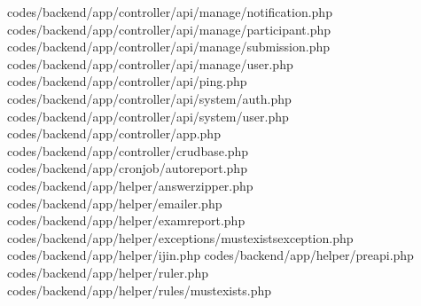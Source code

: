 codes/backend/app/controller/api/manage/notification.php
codes/backend/app/controller/api/manage/participant.php
codes/backend/app/controller/api/manage/submission.php
codes/backend/app/controller/api/manage/user.php
codes/backend/app/controller/api/ping.php
codes/backend/app/controller/api/system/auth.php
codes/backend/app/controller/api/system/user.php
codes/backend/app/controller/app.php
codes/backend/app/controller/crudbase.php
codes/backend/app/cronjob/autoreport.php
codes/backend/app/helper/answerzipper.php
codes/backend/app/helper/emailer.php
codes/backend/app/helper/examreport.php
codes/backend/app/helper/exceptions/mustexistsexception.php
codes/backend/app/helper/ijin.php
codes/backend/app/helper/preapi.php
codes/backend/app/helper/ruler.php
codes/backend/app/helper/rules/mustexists.php
